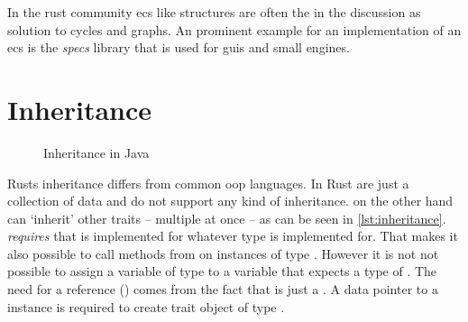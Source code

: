 \documentclass[thesis]{subfiles}
\begin{document}
    In the rust community \gls{ecs} like structures are often the in the discussion as solution to cycles and graphs\autocites{rust-graph-r4cpp}{rust-graph-leipzig}{rust-graph-niko}{rust-graph-exyr}.
    An prominent example for an implementation of an \gls{ecs} is the \emph{specs}\autocite{rust-specs} library that is used for \glspl{gui}\autocite{rust-xi} and small engines\autocites{rust-amethyst}{rust-rhusics}.

\section{Inheritance}\label{sec:inheritance}
  \newsavebox{\inheritanceJava}
  \begin{lrbox}{\inheritanceJava}%
    \begin{minipage}{.25\linewidth}
      
    \end{minipage}
  \end{lrbox}

  \begin{wrapfigure}{r}{0.38\textwidth}
    \vspace*{-1.825\baselineskip}%
    \captionsetup{type=lstlisting}
    \begin{center}
      \usebox{\inheritanceJava}
    \end{center}
    \vspace*{-\baselineskip}%
    \caption{Inheritance in Java}\label{lst:inheritanceJava}%
    \vspace*{-\baselineskip}%
  \end{wrapfigure}
  Rusts inheritance differs from common \gls{oop} languages.
  In Rust \structs are just a collection of data and do not support any kind of inheritance.
  \traits  on the other hand can `inherit' other traits -- multiple at once -- as can be seen in \autoref{lst:inheritance}.
   \emph{requires} that  is implemented for whatever type  is implemented for.
  That makes it also possible to call methods from  on instances of type .
  However it is not not possible to assign a variable of type  to a variable that expects a type of .
  The need for a reference (\codr{&}) comes from the fact that  is just a \trait.
  A data pointer to a \struct instance is required to create trait object of type .
\end{document}
